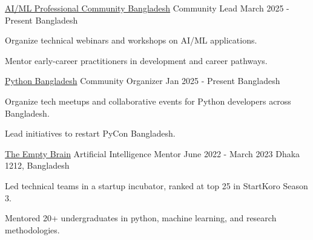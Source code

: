 


\begin{cventries}
\cventry
    {\href{https://aimlcommunity.pythonbd.org/}{AI/ML Professional Community Bangladesh}} %
    {Community Lead} %
    {March 2025 - Present} %
    {Bangladesh} %
    {
      \begin{cvitems} %
        \item{Organize technical webinars and workshops on AI/ML applications.}
        \item{Mentor early-career practitioners in development and career pathways.}
      \end{cvitems}
    }

  \cventry
    {\href{https://pythonbd.org/}{Python Bangladesh}} %
    {Community Organizer} %
    {Jan 2025 - Present} %
    {Bangladesh} %
    {
      \begin{cvitems} %
        \item{Organize tech meetups and collaborative events for Python developers across Bangladesh.}
        \item{Lead initiatives to restart PyCon Bangladesh.}
      \end{cvitems}
    }

  \cventry
    {\href{https://empty-brain.github.io/}{The Empty Brain}} %
    {Artificial Intelligence Mentor} %
    {June 2022 - March 2023} %
    {Dhaka 1212, Bangladesh} %
    {
      \begin{cvitems} %
        \item{Led technical teams in a startup incubator, ranked at top 25 in StartKoro Season 3.}
        \item{Mentored 20+ undergraduates in python, machine learning, and research methodologies.}
      \end{cvitems}
    }    


\end{cventries}
